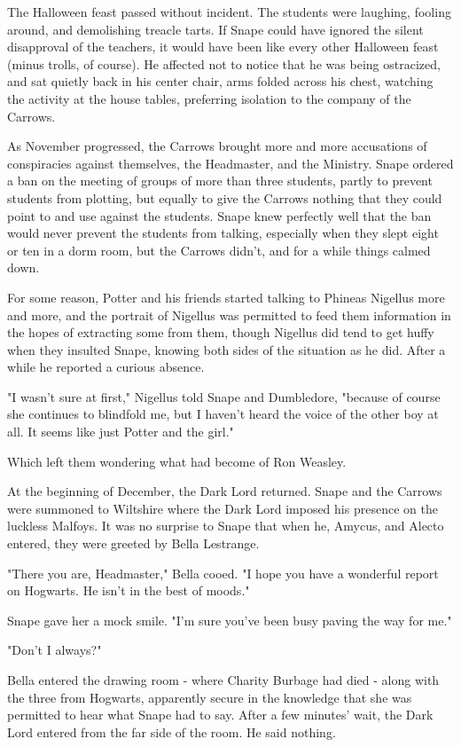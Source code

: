 \documentclass[a4paper,11pt]{article}
\begin{document}
The Halloween feast passed without incident. The students were laughing, fooling around, and demolishing treacle tarts. If Snape could have ignored the silent disapproval of the teachers, it would have been like every other Halloween feast (minus trolls, of course). He affected not to notice that he was being ostracized, and sat quietly back in his center chair, arms folded across his chest, watching the activity at the house tables, preferring isolation to the company of the Carrows.

As November progressed, the Carrows brought more and more accusations of conspiracies against themselves, the Headmaster, and the Ministry. Snape ordered a ban on the meeting of groups of more than three students, partly to prevent students from plotting, but equally to give the Carrows nothing that they could point to and use against the students. Snape knew perfectly well that the ban would never prevent the students from talking, especially when they slept eight or ten in a dorm room, but the Carrows didn't, and for a while things calmed down.

For some reason, Potter and his friends started talking to Phineas Nigellus more and more, and the portrait of Nigellus was permitted to feed them information in the hopes of extracting some from them, though Nigellus did tend to get huffy when they insulted Snape, knowing both sides of the situation as he did. After a while he reported a curious absence.

"I wasn't sure at first," Nigellus told Snape and Dumbledore, "because of course she continues to blindfold me, but I haven't heard the voice of the other boy at all. It seems like just Potter and the girl."

Which left them wondering what had become of Ron Weasley.

At the beginning of December, the Dark Lord returned. Snape and the Carrows were summoned to Wiltshire where the Dark Lord imposed his presence on the luckless Malfoys. It was no surprise to Snape that when he, Amycus, and Alecto entered, they were greeted by Bella Lestrange.

"There you are, Headmaster," Bella cooed. "I hope you have a wonderful report on Hogwarts. He isn't in the best of moods."

Snape gave her a mock smile. "I'm sure you've been busy paving the way for me."

"Don't I always?"

Bella entered the drawing room - where Charity Burbage had died - along with the three from Hogwarts, apparently secure in the knowledge that she was permitted to hear what Snape had to say. After a few minutes' wait, the Dark Lord entered from the far side of the room. He said nothing.
\end{document}
